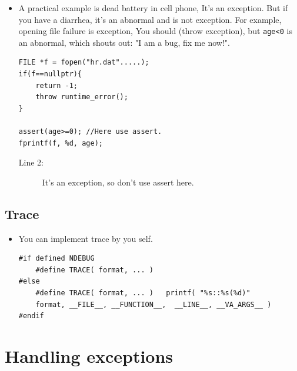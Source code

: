 \documentclass[a4paper,11pt,twoside]{book}
\begin{document}
\begin{itemize}
	\item A practical example is dead battery in cell phone, It's an exception. But if you have a diarrhea, it's an abnormal and is not exception. For example, opening file failure is exception, You should (throw exception), but \texttt{age<0} is an abnormal, which shouts out: "I am a bug, fix me now!". 
\begin{lstlisting}[numbers=none]
FILE *f = fopen("hr.dat".....);
if(f==nullptr){  
	return -1;
	throw runtime_error();
}
	
assert(age>=0); //Here use assert.
fprintf(f, %d, age);
\end{lstlisting}
\begin{description}
	\item[Line 2:] It's an exception, so don't use assert here.
\end{description}
	
\end{itemize}

\subsection{Trace}
\begin{itemize}
	\item You can implement trace by you self.
\begin{lstlisting}[numbers=none]
#if defined NDEBUG
	#define TRACE( format, ... )
#else
	#define TRACE( format, ... )   printf( "%s::%s(%d)"
	format, __FILE__, __FUNCTION__,  __LINE__, __VA_ARGS__ )
#endif
	\end{lstlisting}
	
\end{itemize}

\section{Handling exceptions}
\end{document}

